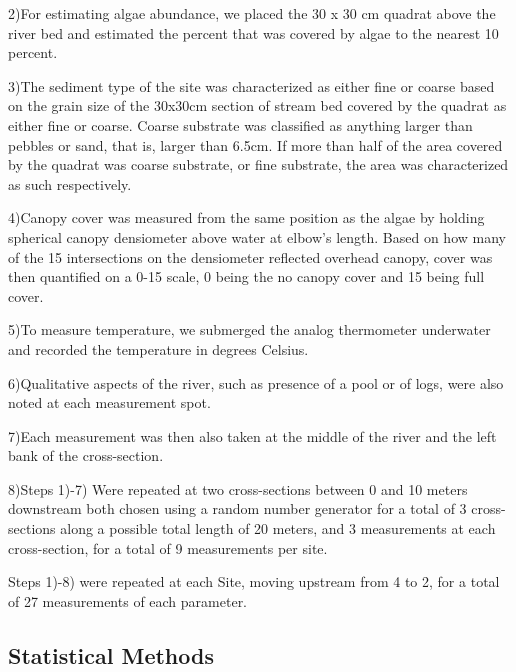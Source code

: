 \documentclass{article}
\begin{document}
2)For estimating algae abundance, we placed the 30  x 30 cm quadrat above the river bed and estimated
the percent that was covered by algae to the nearest 10 percent.

3)The sediment type of the site was characterized as either fine or coarse based on the grain size of the 30x30cm section of stream bed covered by the quadrat as either fine or coarse. Coarse substrate was classified as anything larger than pebbles or sand, that is, larger than 6.5cm. If more than half of the area covered by the quadrat was coarse substrate, or fine substrate, the area was characterized as such respectively.

4)Canopy cover was measured from the same position as the algae by holding spherical canopy densiometer above water at elbow’s length. Based on how many of the 15 intersections on the densiometer reflected overhead canopy, cover was then quantified on a 0-15 scale, 0 being the no canopy cover and 15 being full cover.

5)To measure temperature, we submerged the analog thermometer underwater and recorded the temperature in degrees Celsius.

6)Qualitative aspects of the river, such as presence of a pool or of logs, were also noted at each measurement spot.

7)Each measurement was then also taken at the middle of the river and the left bank of the cross-section. 

8)Steps 1)-7) Were repeated at two cross-sections between 0 and 10 meters downstream both chosen using a random number generator for a total of 3 cross-sections along a possible total length of 20 meters, and 3 measurements at each cross-section, for a total of 9 measurements per site. 


Steps 1)-8) were repeated at each Site, moving upstream from 4 to 2, for a total of 27 measurements of each parameter.


\subsection{Statistical Methods}
\end{document}
